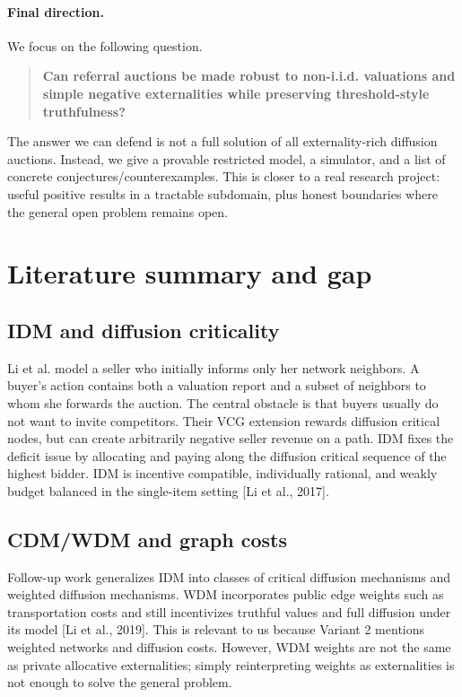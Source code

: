 \documentclass[11pt]{article}
\begin{document}
\paragraph{Final direction.} We focus on the following question.

\begin{quote}
\textbf{Can referral auctions be made robust to non-i.i.d. valuations and simple negative externalities while preserving threshold-style truthfulness?}
\end{quote}

The answer we can defend is not a full solution of all externality-rich diffusion auctions. Instead, we give a provable restricted model, a simulator, and a list of concrete conjectures/counterexamples. This is closer to a real research project: useful positive results in a tractable subdomain, plus honest boundaries where the general open problem remains open.

\section{Literature summary and gap}

\subsection{IDM and diffusion criticality}

Li et al. model a seller who initially informs only her network neighbors. A buyer's action contains both a valuation report and a subset of neighbors to whom she forwards the auction. The central obstacle is that buyers usually do not want to invite competitors. Their VCG extension rewards diffusion critical nodes, but can create arbitrarily negative seller revenue on a path. IDM fixes the deficit issue by allocating and paying along the diffusion critical sequence of the highest bidder. IDM is incentive compatible, individually rational, and weakly budget balanced in the single-item setting [Li et al., 2017].

\subsection{CDM/WDM and graph costs}

Follow-up work generalizes IDM into classes of critical diffusion mechanisms and weighted diffusion mechanisms. WDM incorporates public edge weights such as transportation costs and still incentivizes truthful values and full diffusion under its model [Li et al., 2019]. This is relevant to us because Variant 2 mentions weighted networks and diffusion costs. However, WDM weights are not the same as private allocative externalities; simply reinterpreting weights as externalities is not enough to solve the general problem.
\end{document}
